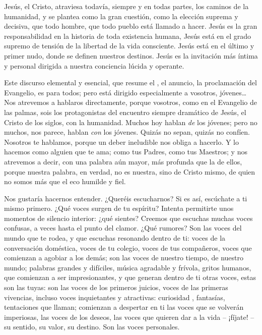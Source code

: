 \begin{body}
Jesús, el Cristo, atraviesa todavía, siempre y en todas partes, los caminos de la humanidad, y se plantea como la gran cuestión, como la elección suprema y decisiva, que todo hombre, que todo pueblo está llamado a hacer. Jesús es la gran responsabilidad en la historia de toda existencia humana, Jesús está en el grado supremo de tensión de la libertad de la vida consciente. Jesús está en el último y primer nudo, donde se definen nuestros destinos. Jesús es la invitación más íntima y personal dirigida a nuestra conciencia lúcida y operante.


Este discurso elemental y esencial, que resume el , el anuncio, la proclamación del Evangelio, es para todos; pero está dirigido especialmente a vosotros, jóvenes\ldots Nos atrevemos a hablaros directamente, porque vosotros, como en el Evangelio de las palmas, sois los protagonistas del encuentro siempre dramático de Jesús, el Cristo de los siglos, con la humanidad. Muchos hoy hablan \textit{de} los jóvenes; pero no muchos, nos parece, hablan \textit{con} los jóvenes. Quizás no sepan, quizás no confíen. Nosotros te hablamos, porque un deber ineludible nos obliga a hacerlo. Y lo hacemos como alguien que te ama; como tus Padres, como tus Maestros; y nos atrevemos a decir, con una palabra aún mayor, más profunda que la de ellos, porque nuestra palabra, en verdad, no es nuestra, sino de Cristo mismo, de quien no somos más que el eco humilde y fiel.

Nos gustaría hacernos entender. ¿Queréis escucharnos? Si es así, escúchate a ti mismo primero. ¿Qué voces surgen de tu espíritu? Intenta permitirte unos momentos de silencio interior: ¿qué sientes? Creemos que escuchas muchas voces confusas, a veces hasta el punto del clamor. ¿Qué rumores? Son las voces del mundo que te rodea, y que escuchas resonando dentro de ti: voces de la conversación doméstica, voces de tu colegio, voces de tus compañeros, voces que comienzan a agobiar a los demás; son las voces de nuestro tiempo, de nuestro mundo; palabras grandes y difíciles, música agradable y frívola, gritos humanos, que comienzan a ser impresionantes, y que generan dentro de ti otras voces, estas son las tuyas: son las voces de los primeros juicios, voces de las primeras vivencias, incluso voces inquietantes y atractivas: curiosidad , fantasías, tentaciones que llaman; comienzan a despertar en ti las voces que se volverán imperiosas, las voces de los deseos, las voces que quieren dar a la vida – ¡fíjate! – su sentido, su valor, su destino. Son las voces personales.


\end{body}
